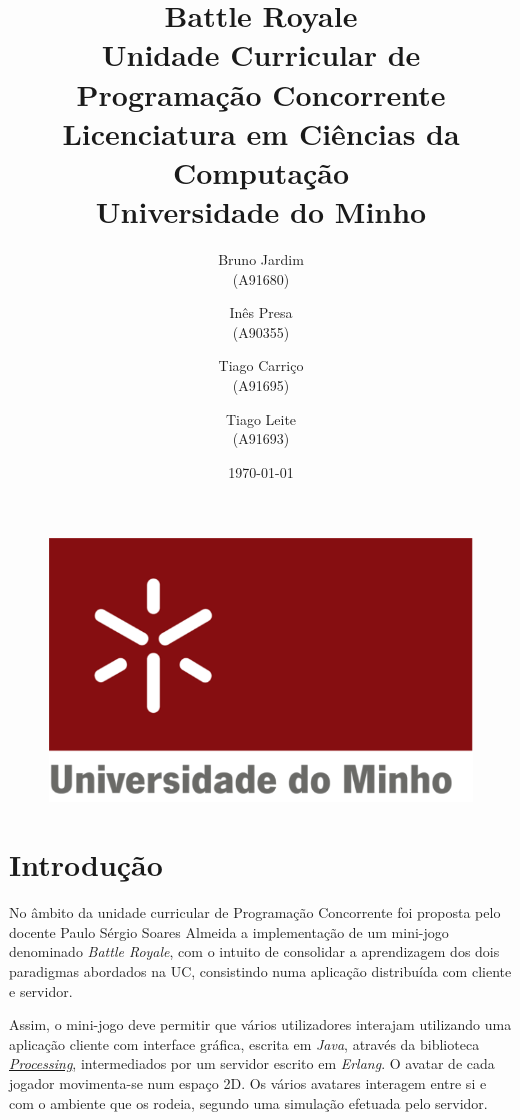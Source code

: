 \documentclass[11pt,a4paper]{report}
\begin{document}
\begin{figure}
    \includegraphics[scale=0.3]{logoum.png}
\end{figure}
\title{\textbf{Battle Royale}\\
       \textbf{Unidade Curricular de Programação Concorrente}\\ Licenciatura em Ciências da Computação\\Universidade do Minho
       } %
\author{Bruno Jardim\\ (A91680) \and Inês Presa\\ (A90355)
         \and Tiago Carriço\\ (A91695) \and Tiago Leite\\ (A91693)
       } %
\date{\today} %
\maketitle
\begingroup
\renewcommand*\contentsname{Índice}
\let\clearpage\relax
\tableofcontents


\endgroup
\newpage

\chapter{Introdução}

	No âmbito da unidade curricular de Programação Concorrente foi proposta pelo docente Paulo Sérgio Soares Almeida a implementação de um mini-jogo denominado \textit{Battle Royale}, com o intuito de consolidar a aprendizagem dos dois paradigmas abordados na UC, consistindo numa aplicação distribuída com cliente e servidor.
	
	Assim, o mini-jogo deve permitir que vários utilizadores interajam utilizando uma aplicação cliente com interface gráfica, escrita em \textit{Java}, através da biblioteca \href{https://processing.org}{\textit{Processing}}, intermediados por um servidor escrito em \textit{Erlang}. O avatar de cada jogador movimenta-se num espaço 2D. Os vários avatares interagem entre si e com o ambiente que os rodeia, segundo uma simulação efetuada pelo servidor.
    
\end{document}
